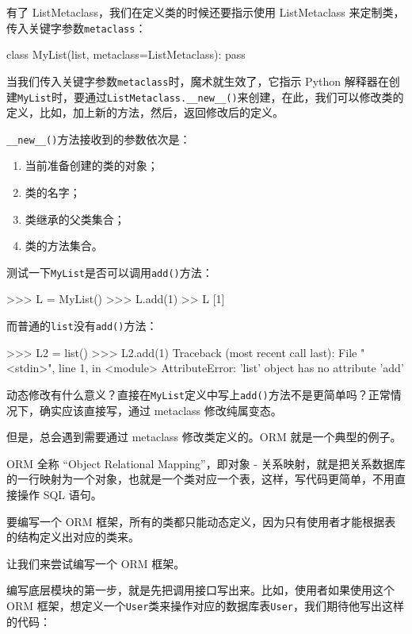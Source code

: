 有了 ListMetaclass，我们在定义类的时候还要指示使用 ListMetaclass
来定制类，传入关键字参数\texttt{metaclass}：

\begin{pythoncode}
class MyList(list, metaclass=ListMetaclass):
    pass
\end{pythoncode}

当我们传入关键字参数\texttt{metaclass}时，魔术就生效了，它指示 Python
解释器在创建\texttt{MyList}时，要通过\texttt{ListMetaclass.\_\_new\_\_()}来创建，在此，我们可以修改类的定义，比如，加上新的方法，然后，返回修改后的定义。

\texttt{\_\_new\_\_()}方法接收到的参数依次是：

\begin{enumerate}
\def\labelenumi{\arabic{enumi}.}
\item
  当前准备创建的类的对象；
\item
  类的名字；
\item
  类继承的父类集合；
\item
  类的方法集合。
\end{enumerate}

测试一下\texttt{MyList}是否可以调用\texttt{add()}方法：

\begin{pythoncode}
>>> L = MyList()
>>> L.add(1)
>> L
[1]
\end{pythoncode}

而普通的\texttt{list}没有\texttt{add()}方法：

\begin{pythoncode}
>>> L2 = list()
>>> L2.add(1)
Traceback (most recent call last):
  File "<stdin>", line 1, in <module>
AttributeError: 'list' object has no attribute 'add'
\end{pythoncode}

动态修改有什么意义？直接在\texttt{MyList}定义中写上\texttt{add()}方法不是更简单吗？正常情况下，确实应该直接写，通过
metaclass 修改纯属变态。

但是，总会遇到需要通过 metaclass 修改类定义的。ORM 就是一个典型的例子。

ORM 全称 ``Object Relational Mapping''，即对象 -
关系映射，就是把关系数据库的一行映射为一个对象，也就是一个类对应一个表，这样，写代码更简单，不用直接操作
SQL 语句。

要编写一个 ORM
框架，所有的类都只能动态定义，因为只有使用者才能根据表的结构定义出对应的类来。

让我们来尝试编写一个 ORM 框架。

编写底层模块的第一步，就是先把调用接口写出来。比如，使用者如果使用这个
ORM
框架，想定义一个\texttt{User}类来操作对应的数据库表\texttt{User}，我们期待他写出这样的代码：

